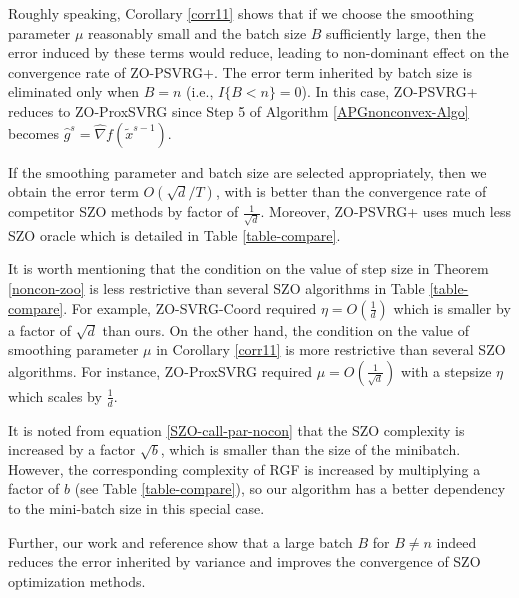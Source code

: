 \documentclass{article}
\theoremstyle{definition}
\theoremstyle{remark}
\begin{document}
Roughly speaking, Corollary \ref{corr11} shows  that if we choose the smoothing parameter $\mu$ reasonably small and the batch size $B$ sufficiently large, then the error induced by these terms would reduce, leading to non-dominant effect on the convergence rate of ZO-PSVRG+.
The error term inherited by batch size  is eliminated only when $B = n$  (i.e., $I\{B < n\} = 0$). In
this case, ZO-PSVRG+ reduces to ZO-ProxSVRG since Step 5 of Algorithm \ref{APGnonconvex-Algo} becomes $\hat{g}^s = \hat{\nabla} f(\tilde{x}^{s-1})$. 

If the smoothing parameter and batch size are selected appropriately, then we obtain the error term $O(\sqrt{d}/T)$, with is better than the convergence rate of competitor SZO methods by factor of $\frac{1}{\sqrt{d}}$. Moreover, ZO-PSVRG+ uses much less SZO oracle which is detailed in Table \ref{table-compare}.

It is worth mentioning that the condition on the value of step size in Theorem \ref{noncon-zoo} is less restrictive than several SZO algorithms  in Table \ref{table-compare}. For example, ZO-SVRG-Coord required $\eta = O(\frac{1}{d})$ which is smaller by a factor of $\sqrt{d}$ than ours. {\color{Brown}On the other hand, the condition on the value of smoothing parameter $\mu$ in Corollary \ref{corr11} is more restrictive than several SZO algorithms. For instance, ZO-ProxSVRG required $\mu= O(\frac{1}{\sqrt{d}})$ with a stepsize $\eta$ which scales by $\frac{1}{d}$.}


{\color{Green}
It is noted from equation \eqref{SZO-call-par-nocon} that the SZO complexity is increased by a factor $\sqrt{b}$, which is smaller than the size of the minibatch. However, the corresponding complexity of RGF is increased by multiplying a factor of $b$ (see Table \ref{table-compare}), so our algorithm has a better dependency to the mini-batch size in this special case.

}
{\color{Brown}
Further, our work and reference \cite{f} show that a large batch $B$  for $B \neq n$ indeed reduces the error inherited by variance and improves the convergence of SZO optimization methods.
}
\end{document}
